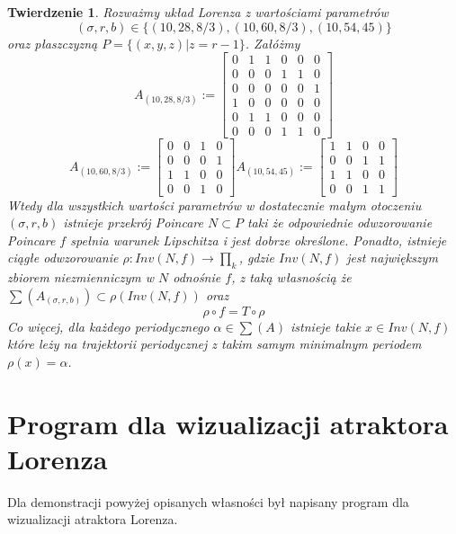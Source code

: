 \documentclass[12pt]{report}
\newtheorem{theorem}{Twierdzenie}
\begin{document}
	\begin{theorem}
		Rozważmy układ Lorenza z wartościami parametrów
			\[ (\sigma, r, b) \in \{(10, 28, 8/3), (10, 60, 8/3), (10, 54, 45)\} \]
		oraz płaszczyzną $P = \{(x, y, z) | z = r - 1\}$. Załóżmy
			\[ A_{(10,28,8/3)} := \begin{bmatrix}
									0 & 1 & 1 & 0 & 0 & 0 \\
									0 & 0 & 0 & 1 & 1 & 0 \\
									0 & 0 & 0 & 0 & 0 & 1 \\
									1 & 0 & 0 & 0 & 0 & 0 \\
									0 & 1 & 1 & 0 & 0 & 0 \\
									0 & 0 & 0 & 1 & 1 & 0
								\end{bmatrix}
			\]
			\[
			   A_{(10,60,8/3)} := \begin{bmatrix}
			   						0 & 0 & 1 & 0 \\
			   						0 & 0 & 0 & 1 \\
			   						1 & 1 & 0 & 0 \\
			   						0 & 0 & 1 & 0
			   					\end{bmatrix}
			   A_{(10,54,45)} := \begin{bmatrix}
			   						1 & 1 & 0 & 0 \\
			   						0 & 0 & 1 & 1 \\
			   						1 & 1 & 0 & 0 \\
			   						0 & 0 & 1 & 1
			   					\end{bmatrix}
			\]
		Wtedy dla wszystkich wartości parametrów w dostatecznie małym otoczeniu $(\sigma, r, b)$ istnieje przekrój Poincare $N \subset P$ taki że odpowiednie odwzorowanie Poincare $f$ spełnia warunek Lipschitza i jest dobrze określone. Ponadto, istnieje ciągłe odwzorowanie $\rho : Inv(N, f) \to \prod_k$, gdzie $Inv(N, f)$ jest największym zbiorem niezmienniczym w $N$ odnośnie $f$, z taką własnością że $\sum (A_{(\sigma, r, b)}) \subset \rho (Inv(N, f))$ oraz
			\[ \rho \circ f = T \circ \rho \]
		Co więcej, dla każdego periodycznego $\alpha \in \sum (A)$ istnieje takie $x \in Inv(N, f)$ które leży na trajektorii periodycznej z takim samym minimalnym periodem $\rho(x) = \alpha$. \cite{MMS}
	\end{theorem}

\chapter{Program dla wizualizacji atraktora Lorenza}
	\par Dla demonstracji powyżej opisanych własności był napisany program dla wizualizacji atraktora Lorenza.
	
\end{document}
